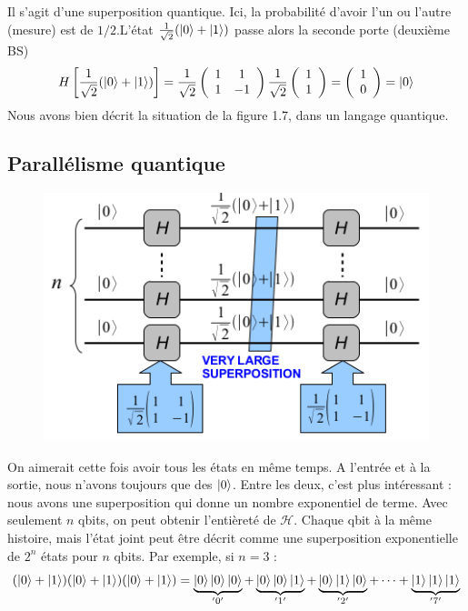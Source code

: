 Il s'agit d'une superposition quantique. Ici, la probabilité d'avoir l'un ou l'autre
(mesure) est de $1/2$.L'état $\frac{1}{\sqrt{2}}(\ket0+\ket1)$ passe alors la seconde porte 
(deuxième BS)
\begin{equation}
H\left[\frac{1}{\sqrt{2}}(\ket0+\ket1)\right] = 
\frac{1}{\sqrt{2}}\left(\begin{array}{cc}
1&1\\
1&-1
\end{array}\right)\frac{1}{\sqrt{2}}\left(\begin{array}{c}
1\\
1
\end{array}\right) =\left(\begin{array}{c}
1\\
0
\end{array}\right)=\ket0
\end{equation}
Nous avons bien décrit la situation de la figure 1.7, dans un langage quantique.

\subsection{Parallélisme quantique}
	\begin{figure}
	\vspace{-5mm}
	\includegraphics[scale=0.29]{ch1/image8}
	\end{figure}
On aimerait cette fois avoir tous les états en même temps. A l'entrée et à la sortie, 
nous n'avons toujours que des $\ket0$. Entre les deux, c'est plus intéressant : nous avons
une superposition qui donne un nombre exponentiel de terme. Avec seulement $n$ qbits, on
peut obtenir l’entièreté de $\mathcal{H}$. Chaque qbit à la même histoire, mais l'état 
joint peut être décrit comme une superposition exponentielle de $2^n$ états pour $n$
qbits. Par exemple, si $n=3$ :
\begin{equation}
(\ket0+\ket1)(\ket0+\ket1)(\ket0+\ket1)=\underbrace{\ket0\ket0\ket0}_{'0'}+
\underbrace{\ket0\ket0\ket1}_{'1'}+\underbrace{\ket0\ket1\ket0}_{'2'}+\dots+
\underbrace{\ket1\ket1\ket1}_{'7'}
\end{equation}


